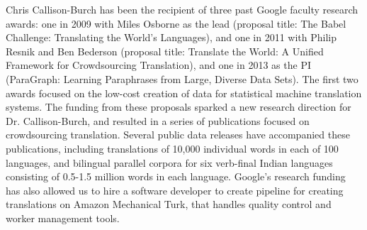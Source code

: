 \documentclass[11pt]{article}
\begin{document}
Chris Callison-Burch has been the recipient of three past Google faculty
research awards: one in 2009 with Miles Osborne as the lead (proposal
title: The Babel Challenge: Translating the World's Languages), and
one in 2011 with Philip Resnik and Ben Bederson (proposal title:
Translate the World: A Unified Framework for Crowdsourcing
Translation), and one in 2013 as the PI (ParaGraph: Learning Paraphrases from Large, Diverse Data
  Sets).  The first two awards focused on the low-cost creation of data for
statistical machine translation systems.  The funding from these
proposals sparked a new research direction for Dr. Callison-Burch, and
resulted in a series of publications focused on crowdsourcing
translation.
Several public data releases have accompanied these publications,
including translations of 10,000 individual words in each of 100
languages, and bilingual parallel corpora for six verb-final Indian
languages consisting of 0.5-1.5 million words in each language.
Google's research funding has also allowed us to hire a software
developer to create pipeline for creating translations on Amazon
Mechanical Turk, that handles quality control and worker management
tools. 





\end{document}
